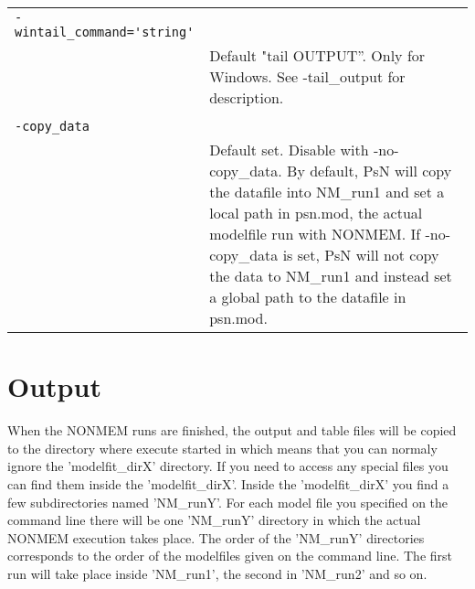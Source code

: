 \documentclass[a4paper,12pt]{article}
\begin{document}
\begin{longtable}{p{1in}p{4in}}
\\
\verb|-wintail_command='string'| & \\
\nopagebreak
 & Default "tail OUTPUT”. Only for Windows. See -tail\_output for description.\\
\\
\verb|-copy_data| & \\
\nopagebreak
 & Default set. Disable with -no-copy\_data. By default, PsN will copy the datafile into NM\_run1 and set a local path in psn.mod, the actual modelfile run with NONMEM. If -no-copy\_data is set, PsN will not copy the data to NM\_run1 and instead set a global path to the datafile in psn.mod.\\
\end{longtable}


\section{Output}

When the NONMEM runs are finished, the output and table files will be copied to the directory where execute started in which means that you can normaly ignore the 'modelfit\_dirX' directory. If you need to access any special files you can find them inside the 'modelfit\_dirX'. Inside the 'modelfit\_dirX' you find a few subdirectories named 'NM\_runY'. For each model file you specified on the command line there will be one 'NM\_runY' directory in which the actual NONMEM execution takes place. The order of the 'NM\_runY' directories corresponds to the order of the modelfiles given on the command line. The first run will take place inside 'NM\_run1', the second in 'NM\_run2' and so on.
\end{document}
